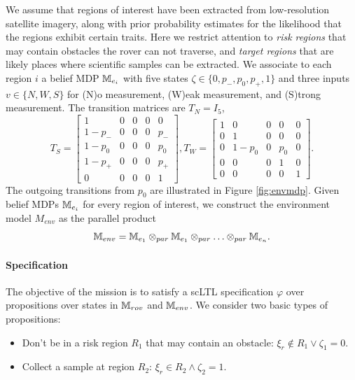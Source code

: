 \documentclass[conference]{IEEEtran}
\begin{document}
We assume that regions of interest have been extracted from low-resolution satellite imagery, along with prior probability estimates for the likelihood that the regions exhibit certain traits. Here we restrict attention to \emph{risk regions} that may contain obstacles the rover can not traverse, and \emph{target regions} that are likely places where scientific samples can be extracted. We associate to each region $i$ a belief MDP $\mathbb{M}_{e_i}$ with five states $\zeta \in \{ 0, p_-, p_0, p_+, 1\}$ and three inputs $v \in \{ N, W, S \}$ for (N)o measurement, (W)eak measurement, and (S)trong measurement. The transition matrices are $T_N = I_5$,
\begin{equation}
  T_{S} = \left[\begin{smallmatrix}
    1        &  0  &  0  &  0  &  0   \\
    1- p_- &  0  &  0  &  0  &  p_- \\
    1- p_0 &  0  &  0  &  0  &  p_0 \\
    1- p_+ &  0  &  0  &  0  &  p_+ \\
    0        &  0  &  0  &  0  &  1
  \end{smallmatrix}\right],
  T_{W} = \left[\begin{smallmatrix}
    1        &  0                &  0  &  0           &  0   \\
    0        &  1                &  0  &  0           &  0 \\
    0        &  1- p_0         &  0  & p_0          &  0\\
    0        &  0                &  0  &  1           &  0 \\
    0        &  0  &  0  &  0  &  1
  \end{smallmatrix}\right].
\end{equation}
The outgoing transitions from $p_0$ are illustrated in Figure \ref{fig:envmdp}. Given belief MDPs $\mathbb{M}_{e_i}$ for every region of interest, we construct the environment model $M_{env}$ as the parallel product
\begin{equation*}
  \mathbb{M}_{env} = \mathbb{M}_{e_1} \otimes_{par} \mathbb{M}_{e_1}  \otimes_{par} \ldots \otimes_{par} \mathbb{M}_{e_n}.
\end{equation*}

\paragraph{Specification}

The objective of the mission is to satisfy a scLTL specification $\varphi$ over propositions over states in $\mathbb{M}_{rov}$ and $\mathbb{M}_{env}$. We consider two basic types of propositions:
\begin{itemize}
  \item Don't be in a risk region $R_1$ that may contain an obstacle: $\xi_r \not  \in R_1 \lor \zeta_1 = 0$.
  \item Collect a sample at region $R_2$: $\xi_r \in R_2 \land \zeta_2 = 1$.
\end{itemize}
\end{document}
